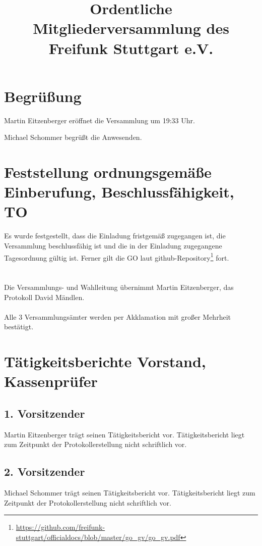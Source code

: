 \documentclass[a4paper]{scrartcl}
\title{Ordentliche Mitgliederversammlung des Freifunk Stuttgart e.V.}
\begin{document}
\maketitle

\tableofcontents

\clearpage

\listoftables

\clearpage

\section{Begrüßung}
Martin Eitzenberger eröffnet die Versammlung um 19:33 Uhr.

Michael Schommer begrüßt die Anwesenden.

\section{Feststellung ordnungsgemäße Einberufung, Beschlussfähigkeit, TO}

Es wurde festgestellt, dass die Einladung fristgemäß zugegangen ist, die Versammlung beschlussfähig ist und die in der Einladung zugegangene Tagesordnung gültig ist.
Ferner gilt die GO laut github-Repository\footnote{\url{https://github.com/freifunk-stuttgart/officialdocs/blob/master/go_gv/go_gv.pdf}} fort.\\
\\
\\
Die Versammlungs- und Wahlleitung übernimmt Martin Eitzenberger, das Protokoll David Mändlen.\\
\\
Alle 3 Versammlungsämter werden per Akklamation mit großer Mehrheit bestätigt.

\clearpage

\section{Tätigkeitsberichte Vorstand, Kassenprüfer}
\subsection{1. Vorsitzender}
Martin Eitzenberger trägt seinen Tätigkeitsbericht vor.
Tätigkeitsbericht liegt zum Zeitpunkt der Protokollerstellung nicht schriftlich vor.

\subsection{2. Vorsitzender}
Michael Schommer trägt seinen Tätigkeitsbericht vor.
Tätigkeitsbericht liegt zum Zeitpunkt der Protokollerstellung nicht schriftlich vor.
\end{document}
